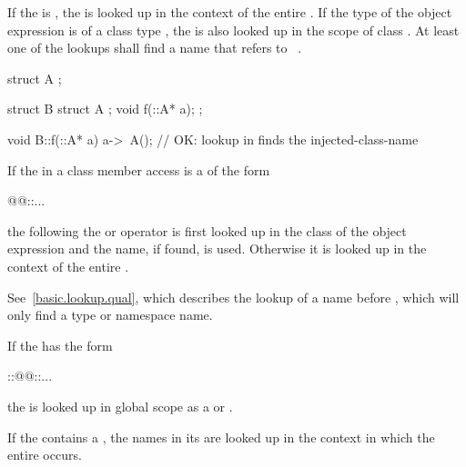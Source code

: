 \pnum
If the  is \tcode{\~}, the
 is looked up in the context of the entire
. If the type  of the object
expression is of a class type , the  is
also looked up in the scope of class . At least one of the
lookups shall find a name that refers to \cv{}~.
\begin{example}
\begin{codeblock}
struct A { };

struct B {
  struct A { };
  void f(::A* a);
};

void B::f(::A* a) {
  a->~A();                      // OK: lookup in  finds the injected-class-name
}
\end{codeblock}
\end{example}

\pnum
If the  in a class member access is a
 of the form
\begin{codeblock}
@@::...
\end{codeblock}
the  following the  or
\tcode{->} operator is
first looked up in the class of the object expression
and the name, if found,
is used. Otherwise it is looked up in the context of the entire
.
\begin{note}
See~\ref{basic.lookup.qual}, which
describes the lookup of a name before \tcode{::}, which will only find a type
or namespace name.
\end{note}

\pnum
If the  has the form
\begin{codeblock}
::@@::...
\end{codeblock}
the  is looked up in global scope
as a  or .

\pnum
If the  contains a
, the names in its
 are looked up in the context in which the
entire  occurs.

